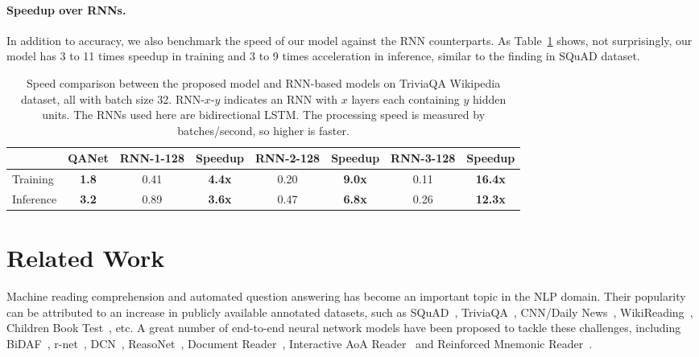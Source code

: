 \documentclass{article} \usepackage{iclr2018_conference,times}
\begin{document}
\paragraph{Speedup over RNNs.} In addition to accuracy, we also benchmark the speed of our model against the RNN counterparts. As Table~\ref{table:triviaqa_speedup} shows, not surprisingly, our model has 3 to 11 times speedup in training and 3 to 9 times acceleration in inference, similar to the finding in SQuAD dataset.
\begin{table}[h!]
\small
\begin{center}
\begin{tabular}{l|c|cc|cc|cc}
\hline &QANet & RNN-1-128 & Speedup & RNN-2-128 & Speedup & RNN-3-128 & Speedup \\\hline
Training& \textbf{1.8} & 0.41 & \textbf{4.4x}  & 0.20 & \textbf{9.0x} & 0.11& \textbf{16.4x}\\
Inference& \textbf{3.2} & 0.89 & \textbf{3.6x}  & 0.47 & \textbf{6.8x} & 0.26 & \textbf{12.3x} 
\\\hline \end{tabular}
\end{center}
\caption{Speed comparison between the proposed model and RNN-based models on TriviaQA Wikipedia dataset, all with batch size 32. RNN-$x$-$y$ indicates an RNN with $x$ layers each containing $y$ hidden units. The RNNs used here are bidirectional LSTM. The processing speed is measured by batches/second, so higher is faster.}
\label{table:triviaqa_speedup}
\end{table}

















 \section{Related Work}\label{sec:rw}

 Machine reading comprehension and automated question answering has become an important topic in the NLP domain. Their popularity can be attributed to an increase in publicly available annotated datasets, such as SQuAD~\citep{RajpurkarZLL16}, TriviaQA~\citep{JoshiCWZ17}, CNN/Daily News~\citep{HermannKGEKSB15}, WikiReading~\citep{HewlettLJPFHKB16}, Children Book Test~\citep{HillBCW15}, etc. A great number of end-to-end neural network models have been proposed to tackle these challenges, including BiDAF~\citep{SeoKFH16}, r-net~\citep{WangYWCZ17}, DCN~\citep{XiongZS16}, ReasoNet~\citep{ShenHGC17}, Document Reader~\citep{ChenFWB17}, Interactive AoA Reader~\citep{CuiCWWLH17} and Reinforced Mnemonic Reader~\citep{HuPQ17}. 
 
\end{document}
